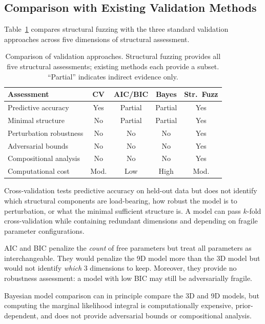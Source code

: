 \documentclass[manuscript,review,anonymous]{acmart}
\begin{document}
\subsection{Comparison with Existing Validation Methods}

Table~\ref{tab:comparison} compares structural fuzzing with the three standard validation approaches across five dimensions of structural assessment.

\begin{table}[t]
\centering
\caption{Comparison of validation approaches. Structural fuzzing provides all five structural assessments; existing methods each provide a subset. ``Partial'' indicates indirect evidence only.}
\label{tab:comparison}
\small
\begin{tabular}{@{}lcccc@{}}
\toprule
\textbf{Assessment} & \textbf{CV} & \textbf{AIC/BIC} & \textbf{Bayes} & \textbf{Str.\ Fuzz} \\
\midrule
Predictive accuracy & Yes & Partial & Partial & Yes \\
Minimal structure & No & Partial & Partial & Yes \\
Perturbation robustness & No & No & No & Yes \\
Adversarial bounds & No & No & No & Yes \\
Compositional analysis & No & No & No & Yes \\
\midrule
Computational cost & Mod. & Low & High & Mod. \\
\bottomrule
\end{tabular}
\end{table}

Cross-validation tests predictive accuracy on held-out data but does not identify which structural components are load-bearing, how robust the model is to perturbation, or what the minimal sufficient structure is.
A model can pass $k$-fold cross-validation while containing redundant dimensions and depending on fragile parameter configurations.

AIC and BIC penalize the \emph{count} of free parameters but treat all parameters as interchangeable.
They would penalize the 9D model more than the 3D model but would not identify \emph{which} 3 dimensions to keep.
Moreover, they provide no robustness assessment: a model with low BIC may still be adversarially fragile.

Bayesian model comparison can in principle compare the 3D and 9D models, but computing the marginal likelihood integral is computationally expensive, prior-dependent, and does not provide adversarial bounds or compositional analysis.
\end{document}
